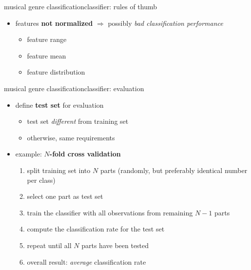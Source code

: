 \begin{frame}{musical genre classification}{classifier: rules of thumb}
\begin{itemize}
\begin{itemize}
                        \item<6->	features \textbf{not normalized} $\Rightarrow$ possibly \textit{bad classification performance}
                            \begin{itemize}
                                \item	feature range
                                \item	feature mean
                                \item	feature distribution
                            \end{itemize}
                    \end{itemize}
            \end{itemize}
        \end{frame}
        \begin{frame}{musical genre classification}{classifier: evaluation}
            \begin{itemize}
                \item	define \textbf{test set} for evaluation
                    \begin{itemize}
                        \item	test set \textit{different} from training set
                        \item	otherwise, same requirements
                    \end{itemize}
                
                \bigskip
                \item<2->	example: \textbf{$N$-fold cross validation}
                    \begin{enumerate}
                        \item<2->	split training set into $N$ parts (randomly, but preferably identical number per class)
                        \item<3->	select one part as test set
                        \item<4->	train the classifier with all observations from remaining $N-1$ parts
                        \item<5->	compute the classification rate for the test set
                        \item<6->	repeat until all $N$ parts have been tested
                        \item<7->	overall result: \textit{average} classification rate
                    \end{enumerate}
            \end{itemize}
        \end{frame}
